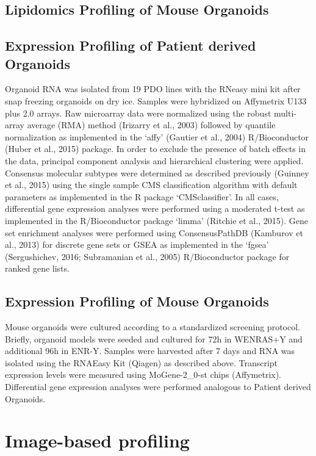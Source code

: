 \begin{flushleft}
\subsection{Lipidomics Profiling of Mouse Organoids}

\subsection{Expression Profiling of Patient derived Organoids}
Organoid RNA was isolated from 19 PDO lines with the RNeasy mini kit after snap freezing organoids on dry ice. Samples were hybridized on Affymetrix U133 plus 2.0 arrays. Raw microarray data were normalized using the robust multi-array average (RMA) method (Irizarry et al., 2003) followed by quantile normalization as implemented in the ‘affy’ (Gautier et al., 2004) R/Bioconductor (Huber et al., 2015) package. In order to exclude the presence of batch effects in the data, principal component analysis and hierarchical clustering were applied. Consensus molecular subtypes were determined as described previously (Guinney et al., 2015) using the single sample CMS classification algorithm with default parameters as implemented in the R package ‘CMSclassifier’. In all cases, differential gene expression analyses were performed using a moderated t-test as implemented in the R/Bioconductor package ‘limma’ (Ritchie et al., 2015). Gene set enrichment analyses were performed using ConsensusPathDB (Kamburov et al., 2013) for discrete gene sets or GSEA as implemented in the ‘fgsea’ (Sergushichev, 2016; Subramanian et al., 2005) R/Bioconductor package for ranked gene lists.

\subsection{Expression Profiling of Mouse Organoids}
Mouse organoids were cultured according to a standardized screening protocol. Briefly, organoid models were seeded and cultured for 72h in WENRAS+Y and additional 96h in ENR-Y. Samples were harvested after 7 days and RNA was isolated using the RNAEasy Kit (Qiagen) as described above. Transcript expression levels were measured using MoGene-2\_0-st chips (Affymetrix).
Differential gene expression analyses were performed analogous to Patient derived Organoids.

\section{Image-based profiling}


\end{flushleft}
